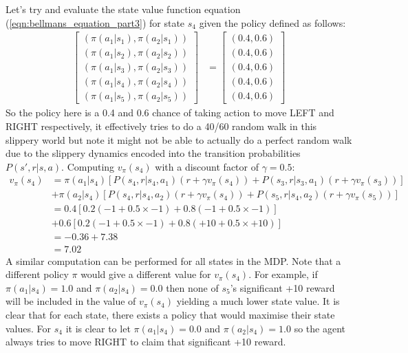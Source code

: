 \documentclass[a4paper,11pt]{article}
\begin{document}
Let's try and evaluate the state value function equation (\ref{eqn:bellmans_equation_part3}) for state $s_4$ given the policy defined as follows:
\begin{equation} \label{eqn:example_policy_for_slippery_world}
\begin{split}
\begin{bmatrix}
    (\pi(a_1|s_1),\pi(a_2|s_1)) \\
    (\pi(a_1|s_2),\pi(a_2|s_2)) \\
    (\pi(a_1|s_3),\pi(a_2|s_3)) \\
    (\pi(a_1|s_4),\pi(a_2|s_4)) \\
    (\pi(a_1|s_5),\pi(a_2|s_5)) 
\end{bmatrix} &= 
\begin{bmatrix}
    (0.4, 0.6) \\
    (0.4, 0.6) \\
    (0.4, 0.6) \\
    (0.4, 0.6) \\
    (0.4, 0.6) 
\end{bmatrix}
\end{split}
\end{equation}
So the policy here is a 0.4 and 0.6 chance of taking action to move LEFT and RIGHT respectively, it effectively tries to do a 40/60 random walk in this slippery world but note it might not be able to actually do a perfect random walk due to the slippery dynamics encoded into the transition probabilities $P(s',r|s,a)$.  Computing $v_{\pi}(s_4)$ with a discount factor of $\gamma=0.5$:
\begin{equation} \label{eqn:v_s4_for_slippery_world}
\begin{split}
    v_{\pi}(s_4) &= \pi(a_1|s_4) [
        P(s_4,r|s_4,a_1)(r + \gamma v_{\pi}(s_4)) +
        P(s_3,r|s_3,a_1)(r + \gamma v_{\pi}(s_3))
    ] \\
    &+ \pi(a_2|s_4) [
        P(s_4,r|s_4,a_2)(r + \gamma v_{\pi}(s_4)) +
        P(s_5,r|s_4,a_2)(r + \gamma v_{\pi}(s_5))
    ] \\
    &= 0.4 [ 0.2 (-1 + 0.5 \times -1) + 0.8 (-1 + 0.5 \times -1) ] \\
    &+ 0.6 [ 0.2 (-1 + 0.5 \times -1) + 0.8 (+10 + 0.5 \times +10) ] \\
    &= -0.36 + 7.38 \\
    &= 7.02
\end{split}
\end{equation}
A similar computation can be performed for all states in the MDP.  Note that a different policy $\pi$ would give a different value for $v_{\pi}(s_4)$.  For example, if $\pi(a_1|s_4) = 1.0$ and $\pi(a_2|s_4) = 0.0$ then none of $s_5$'s significant +10 reward will be included in the value of $v_{\pi}(s_4)$ yielding a much lower state value.  It is clear that for each state, there exists a policy that would maximise their state values.  For $s_4$ it is clear to let $\pi(a_1|s_4) = 0.0$ and $\pi(a_2|s_4) = 1.0$ so the agent always tries to move RIGHT to claim that significant +10 reward.  
\end{document}
